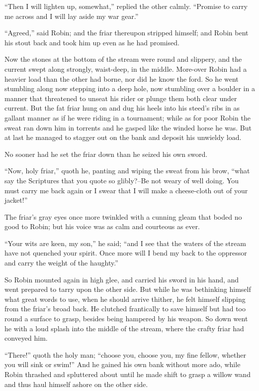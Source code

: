 ``Then I will lighten up, somewhat,'' replied the other calmly.
``Promise to carry me across and I will lay aside my war gear.''

``Agreed,'' said Robin; and the friar thereupon stripped himself; and
Robin bent his stout back and took him up even as he had promised.

Now the stones at the bottom of the stream were round and slippery, and
the current swept along strongly, waist-deep, in the middle. More-over
Robin had a heavier load than the other had borne, nor did he know the
ford. So he went stumbling along now stepping into a deep hole, now
stumbling over a boulder in a manner that threatened to unseat his rider
or plunge them both clear under current. But the fat friar hung on and
dug his heels into his steed's ribs in as gallant manner as if he were
riding in a tournament; while as for poor Robin the sweat ran down him
in torrents and he gasped like the winded horse he was. But at last he
managed to stagger out on the bank and deposit his unwieldy load.

No sooner had he set the friar down than he seized his own sword.

``Now, holy friar,'' quoth he, panting and wiping the sweat from his
brow, ``what say the Scriptures that you quote so glibly?--Be not weary
of well doing. You must carry me back again or I swear that I will make
a cheese-cloth out of your jacket!''

The friar's gray eyes once more twinkled with a cunning gleam that boded
no good to Robin; but his voice was as calm and courteous as ever.

``Your wits are keen, my son,'' he said; ``and I see that the waters of
the stream have not quenched your spirit. Once more will I bend my back
to the oppressor and carry the weight of the haughty.''

So Robin mounted again in high glee, and carried his sword in his hand,
and went prepared to tarry upon the other side. But while he was
bethinking himself what great words to use, when he should arrive
thither, he felt himself slipping from the friar's broad back. He
clutched frantically to save himself but had too round a surface to
grasp, besides being hampered by his weapon. So down went he with a loud
splash into the middle of the stream, where the crafty friar had
conveyed him.

``There!'' quoth the holy man; ``choose you, choose you, my fine fellow,
whether you will sink or swim!'' And he gained his own bank without more
ado, while Robin thrashed and spluttered about until he made shift to
grasp a willow wand and thus haul himself ashore on the other side.

